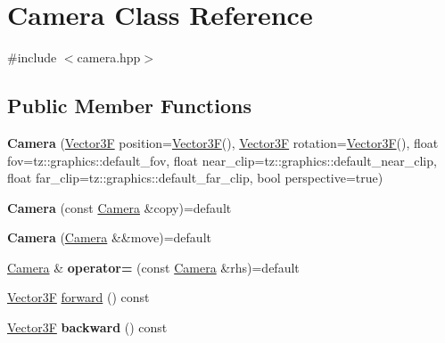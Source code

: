 \hypertarget{class_camera}{}\section{Camera Class Reference}
\label{class_camera}


{\ttfamily \#include $<$camera.\+hpp$>$}

\subsection*{Public Member Functions}
\begin{DoxyCompactItemize}
\item 
\mbox{\label{class_camera_a2041d5828822b4e012237cda28affb8f}} 
{\bfseries Camera} (\mbox{\hyperlink{class_vector3}{Vector3F}} position=\mbox{\hyperlink{class_vector3}{Vector3F}}(), \mbox{\hyperlink{class_vector3}{Vector3F}} rotation=\mbox{\hyperlink{class_vector3}{Vector3F}}(), float fov=tz\+::graphics\+::default\+\_\+fov, float near\+\_\+clip=tz\+::graphics\+::default\+\_\+near\+\_\+clip, float far\+\_\+clip=tz\+::graphics\+::default\+\_\+far\+\_\+clip, bool perspective=true)
\item 
\mbox{\label{class_camera_a621f4f13d34bc9d0c855c3acc46f9d5d}} 
{\bfseries Camera} (const \mbox{\hyperlink{class_camera}{Camera}} \&copy)=default
\item 
\mbox{\label{class_camera_a55c8441cefa78a68563aa2007bd8d922}} 
{\bfseries Camera} (\mbox{\hyperlink{class_camera}{Camera}} \&\&move)=default
\item 
\mbox{\label{class_camera_ac17030e12c64388e1234e9818de54fd8}} 
\mbox{\hyperlink{class_camera}{Camera}} \& {\bfseries operator=} (const \mbox{\hyperlink{class_camera}{Camera}} \&rhs)=default
\item 
\mbox{\hyperlink{class_vector3}{Vector3F}} \mbox{\hyperlink{class_camera_a862269b762daf00f14a5926d77331ec9}{forward}} () const
\item 
\mbox{\label{class_camera_afe69d158ab2f83ed2a4376d031efc80b}} 
\mbox{\hyperlink{class_vector3}{Vector3F}} {\bfseries backward} () const
\item 
\mbox{\label{class_camera_adc0b6b6acc31e820f499733a8b242fd6}} 

\end{DoxyCompactItemize}
